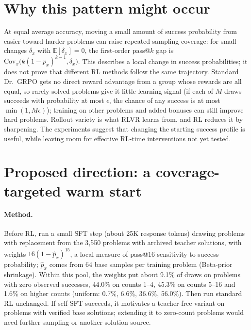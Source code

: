\documentclass[11pt]{article}
\begin{document}
\section{Why this pattern might occur}
At equal average accuracy, moving a small amount of success probability from easier toward harder problems can raise
repeated-sampling coverage: for small changes $\delta_x$ with $\mathbb{E}[\delta_x]=0$, the first-order pass@$k$
gap is $\mathrm{Cov}_x\big(k(1-p_x)^{k-1},\delta_x\big)$. This describes a local change in success probabilities; it
does not prove that different RL methods follow the same trajectory. Standard Dr.~GRPO gets no direct reward
advantage from a group whose rewards are all equal, so rarely solved problems give it little learning signal
(if each of $M$ draws succeeds with probability at most $\epsilon$, the chance of any success is at most
$\min(1, M\epsilon)$); training on other problems and added bonuses can still improve hard problems. Rollout variety
is what RLVR learns from, and RL reduces it by sharpening. The experiments suggest that changing the starting
success profile is useful, while leaving room for effective RL-time interventions not yet tested.

\section{Proposed direction: a coverage-targeted warm start}
\paragraph{Method.} Before RL, run a small SFT step (about 25K response tokens) drawing problems with replacement from
the 3,550 problems with archived teacher solutions, with weights $16(1-\hat p_x)^{15}$, a local measure of pass@16
sensitivity to success probability; $\hat p_x$ comes from 64 base samples per training problem (Beta-prior
shrinkage). Within this pool, the weights put about 9.1\% of draws on problems with zero observed successes, 44.0\% on
counts 1--4, 45.3\% on counts 5--16 and 1.6\% on higher counts (uniform: 0.7\%, 6.6\%, 36.6\%, 56.0\%). Then run
standard RL unchanged. If self-SFT succeeds, it motivates a teacher-free variant on problems with verified base
solutions; extending it to zero-count problems would need further sampling or another solution source.
\end{document}
